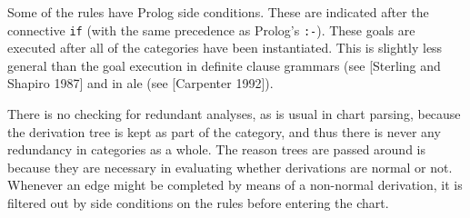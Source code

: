 Some of the rules have Prolog side conditions.  These are indicated
after the connective {\tt if} (with the same precedence as Prolog's
{\tt :-}).  These goals are executed after all of the categories have
been instantiated.  This is slightly less general than the goal
execution in definite clause grammars (see [Sterling and Shapiro 1987]
and in {\sc ale} (see [Carpenter 1992]).

There is no checking for redundant analyses, as is usual in chart
parsing, because the derivation tree is kept as part of the category,
and thus there is never any redundancy in categories as a whole.  The
reason trees are passed around is because they are necessary in
evaluating whether derivations are normal or not.  Whenever an edge
might be completed by means of a non-normal derivation, it is filtered
out by side conditions on the rules before entering the chart.





